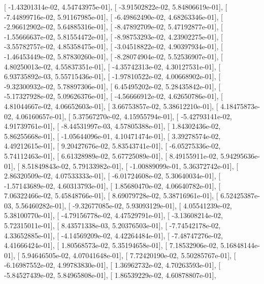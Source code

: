 \documentclass{article}
\begin{document}
       [ -1.43201314e-02,   4.54743975e-01],
       [ -3.91502822e-02,   5.84806619e-01],
       [ -7.44899716e-02,   5.91167985e-01],
       [ -6.49862490e-02,   4.68263346e-01],
       [ -2.96612902e-02,   5.64885316e-01],
       [ -8.47892709e-02,   5.47192877e-01],
       [ -1.55666637e-02,   5.81554472e-01],
       [ -8.98753293e-02,   4.23902275e-01],
       [ -3.55782757e-02,   4.85358475e-01],
       [ -3.04518822e-02,   4.90397934e-01],
       [ -1.46453449e-02,   5.87830260e-01],
       [ -8.28074904e-02,   5.52536907e-01],
       [  4.80250013e-02,   4.55837351e-01],
       [ -4.35742313e-02,   4.30127531e-01],
       [  6.93735892e-03,   5.55715436e-01],
       [ -1.97810522e-02,   4.00668902e-01],
       [ -9.32300932e-02,   5.78897306e-01],
       [  6.45495202e-02,   5.28435842e-01],
       [ -5.17327928e-02,   5.09626376e-01],
       [ -4.56666912e-02,   4.62650786e-01],
       [  4.81044667e-02,   4.06652603e-01],
       [  3.66753857e-02,   5.38612210e-01],
       [  4.18475873e-02,   4.06160657e-01],
       [  5.37567270e-02,   4.15955794e-01],
       [ -5.42793141e-02,   4.91739761e-01],
       [ -8.44531997e-03,   4.57805388e-01],
       [  1.84302436e-02,   5.86255668e-01],
       [ -1.05644096e-01,   4.10471474e-01],
       [  3.39278574e-02,   4.49212615e-01],
       [  9.20427676e-02,   5.83543741e-01],
       [ -6.05275336e-02,   5.74112463e-01],
       [  6.61328989e-02,   5.67725089e-01],
       [  8.49155911e-02,   5.94295636e-01],
       [  8.51849843e-02,   5.79133982e-01],
       [ -1.00889099e-01,   5.36372742e-01],
       [  2.86320509e-02,   4.07533333e-01],
       [ -6.01724608e-02,   5.30640034e-01],
       [ -1.57143689e-02,   4.60313793e-01],
       [  1.85680470e-02,   4.06640782e-01],
       [  7.06322466e-02,   5.45848766e-01],
       [  8.69079728e-02,   5.38716961e-01],
       [  6.52425387e-03,   5.56460282e-01],
       [ -9.32677085e-02,   5.93093129e-01],
       [  4.05541239e-02,   5.38100770e-01],
       [ -4.79156778e-02,   4.47529791e-01],
       [ -3.13608214e-02,   5.72315011e-01],
       [  8.43571338e-03,   5.20376503e-01],
       [ -7.74542178e-02,   4.33652885e-01],
       [ -4.14569209e-02,   4.42264484e-01],
       [ -7.48747276e-02,   4.41666424e-01],
       [  1.80568573e-02,   5.35194658e-01],
       [  7.18532906e-02,   5.16848144e-01],
       [  5.94646505e-02,   4.07041648e-01],
       [  7.72420190e-02,   5.50285767e-01],
       [ -6.16987552e-02,   4.99783830e-01],
       [  1.36962732e-02,   4.70263593e-01],
       [ -5.84527439e-02,   5.84965808e-01],
       [  1.86539229e-02,   4.60878807e-01],
\end{document}
